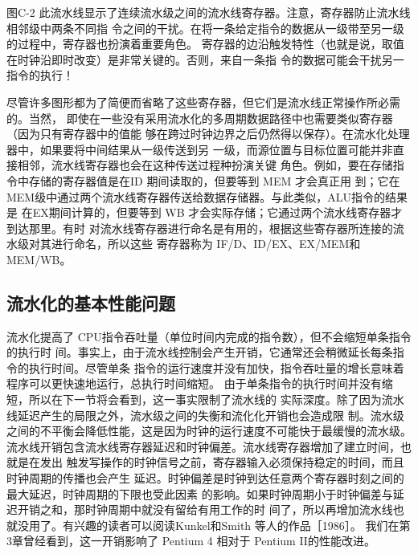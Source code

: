 图C-2 此流水线显示了连续流水级之间的流水线寄存器。注意，寄存器防止流水线相邻级中两条不同指
令之间的干扰。在将一条给定指令的数据从一级带至另一级的过程中，寄存器也扮演着重要角色。
寄存器的边沿触发特性（也就是说，取值在时钟沿即时改变）是非常关键的。否则，来自一条指
令的数据可能会干扰另一指令的执行！

尽管许多图形都为了简便而省略了这些寄存器，但它们是流水线正常操作所必需的。当然，
即使在一些没有采用流水化的多周期数据路径中也需要类似寄存器（因为只有寄存器中的值能
够在跨过时钟边界之后仍然得以保存）。在流水化处理器中，如果要将中间结果从一级传送到另
一级，而源位置与目标位置可能并非直接相邻，流水线寄存器也会在这种传送过程种扮演关键
角色。例如，要在存储指令中存储的寄存器值是在ID 期间读取的，但要等到 MEM 才会真正用
到；它在 MEM级中通过两个流水线寄存器传送给数据存储器。与此类似，ALU指令的结果是
在EX期间计算的，但要等到 WB 才会实际存储；它通过两个流水线寄存器才到达那里。有时
对流水线寄存器进行命名是有用的，根据这些寄存器所连接的流水级对其进行命名，所以这些
寄存器称为 IF/D、ID/EX、EX/MEM和 MEM/WB。

\subsection{流水化的基本性能问题}

流水化提高了 CPU指令吞吐量（单位时间内完成的指令数），但不会缩短单条指令的执行时
间。事实上，由于流水线控制会产生开销，它通常还会稍微延长每条指令的执行时间。尽管单条
指令的运行速度并没有加快，指令吞吐量的增长意味着程序可以更快速地运行，总执行时间缩短。
由于单条指令的执行时间并没有缩短，所以在下一节将会看到，这一事实限制了流水线的
实际深度。除了因为流水线延迟产生的局限之外，流水级之间的失衡和流化化开销也会造成限
制。流水级之间的不平衡会降低性能，这是因为时钟的运行速度不可能快于最缓慢的流水级。
流水线开销包含流水线寄存器延迟和时钟偏差。流水线寄存器增加了建立时间，也就是在发出
触发写操作的时钟信号之前，寄存器输入必须保持稳定的时间，而且时钟周期的传播也会产生
延迟。时钟偏差是时钟到达任意两个寄存器时刻之间的最大延迟，时钟周期的下限也受此因素
的影响。如果时钟周期小于时钟偏差与延迟开销之和，那时钟周期中就没有留给有用工作的时
间了，所以再增加流水线也就没用了。有兴趣的读者可以阅读Kunkel和Smith 等人的作品［1986］。
我们在第3章曾经看到，这一开销影响了 Pentium 4 相对于 Pentium II的性能改进。

